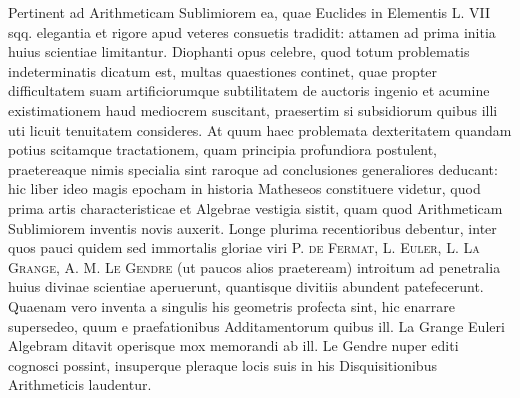 Pertinent ad Arithmeticam Sublimiorem ea, quae Euclides in Elementis L. VII sqq. elegantia et rigore apud veteres consuetis tradidit: attamen ad prima initia huius scientiae limitantur. Diophanti opus celebre, quod totum problematis indeterminatis dicatum est, multas quaestiones continet, quae propter difficultatem suam artificiorumque subtilitatem de auctoris ingenio et acumine existimationem haud mediocrem suscitant, praesertim si subsidiorum quibus illi uti licuit tenuitatem consideres. At quum haec problemata dexteritatem quandam potius scitamque tractationem, quam principia profundiora postulent, praetereaque nimis specialia sint raroque ad conclusiones generaliores deducant: hic liber ideo magis epocham in historia Matheseos constituere videtur, quod prima artis characteristicae et Algebrae vestigia sistit, quam quod Arithmeticam Sublimiorem inventis novis auxerit. Longe plurima recentioribus debentur, inter quos pauci quidem sed immortalis gloriae viri P. \textsc{de Fermat}, L. \textsc{Euler}, L. \textsc{La Grange}, A. M. \textsc{Le Gendre} (ut paucos alios praeteream) introitum ad penetralia huius divinae scientiae aperuerunt, quantisque divitiis abundent patefecerunt. Quaenam vero inventa a singulis his geometris profecta sint, hic enarrare supersedeo, quum e praefationibus Additamentorum quibus ill. La Grange Euleri Algebram ditavit operisque mox memorandi ab ill. Le Gendre nuper editi cognosci possint, insuperque pleraque locis suis in his Disquisitionibus Arithmeticis laudentur.

